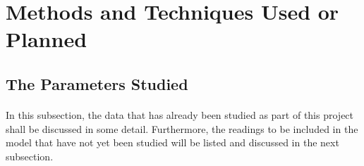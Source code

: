 \documentclass[12pt, twoside]{report}
\begin{document}
	
	
	\section{Methods and Techniques Used or Planned}
	\subsection{The Parameters Studied}
	\paragraph{ }In this subsection, the data that has already been studied as part of this project shall be discussed in some detail. Furthermore, the readings to be included in the model that have not yet been studied will be listed and discussed in the next subsection.
	
\end{document}
